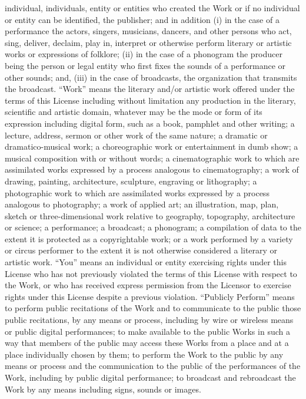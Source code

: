 \documentclass[oneside]{book}
\begin{document}
individual, individuals, entity or entities who created the Work or if no
individual or entity can be identified, the publisher; and in addition (i) in
the case of a performance the actors, singers, musicians, dancers, and other
persons who act, sing, deliver, declaim, play in, interpret or otherwise perform
literary or artistic works or expressions of folklore; (ii) in the case of a
phonogram the producer being the person or legal entity who first fixes the
sounds of a performance or other sounds; and, (iii) in the case of broadcasts,
the organization that transmits the broadcast.
``Work'' means the literary and/or artistic work offered under the terms of this
License including without limitation any production in the literary, scientific
and artistic domain, whatever may be the mode or form of its expression
including digital form, such as a book, pamphlet and other writing; a lecture,
address, sermon or other work of the same nature; a dramatic or
dramatico-musical work; a choreographic work or entertainment in dumb show; a
musical composition with or without words; a cinematographic work to which are
assimilated works expressed by a process analogous to cinematography; a work of
drawing, painting, architecture, sculpture, engraving or lithography; a
photographic work to which are assimilated works expressed by a process
analogous to photography; a work of applied art; an illustration, map, plan,
sketch or three-dimensional work relative to geography, topography, architecture
or science; a performance; a broadcast; a phonogram; a compilation of data to
the extent it is protected as a copyrightable work; or a work performed by a
variety or circus performer to the extent it is not otherwise considered a
literary or artistic work.
``You'' means an individual or entity exercising rights under this License who
has not previously violated the terms of this License with respect to the Work,
or who has received express permission from the Licensor to exercise rights
under this License despite a previous violation.
``Publicly Perform'' means to perform public recitations of the Work and to
communicate to the public those public recitations, by any means or process,
including by wire or wireless means or public digital performances; to make
available to the public Works in such a way that members of the public may
access these Works from a place and at a place individually chosen by them; to
perform the Work to the public by any means or process and the communication to
the public of the performances of the Work, including by public digital
performance; to broadcast and rebroadcast the Work by any means including signs,
sounds or images.
\end{document}

